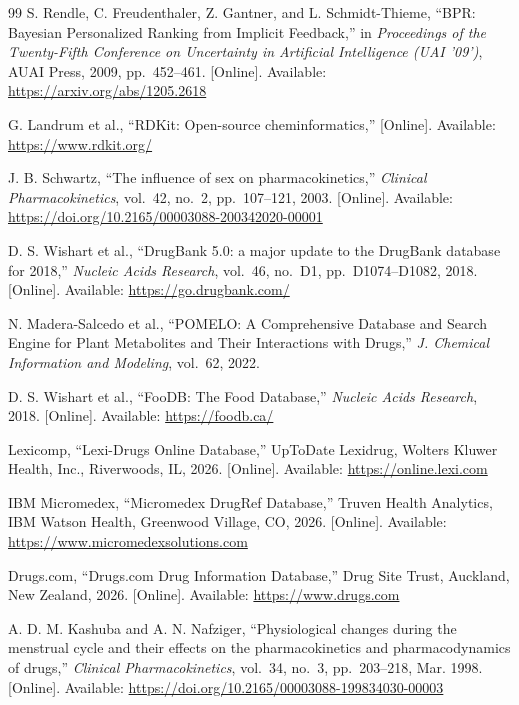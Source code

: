 \begin{thebibliography}{99}
S. Rendle, C. Freudenthaler, Z. Gantner, and L. Schmidt-Thieme,
``BPR: Bayesian Personalized Ranking from Implicit Feedback,''
in \textit{Proceedings of the Twenty-Fifth Conference on Uncertainty in Artificial Intelligence (UAI '09')},
AUAI Press, 2009, pp.~452--461.
[Online]. Available: \url{https://arxiv.org/abs/1205.2618}

G. Landrum et al.,
``RDKit: Open-source cheminformatics,''
[Online]. Available: \url{https://www.rdkit.org/}

J. B. Schwartz,
``The influence of sex on pharmacokinetics,''
\textit{Clinical Pharmacokinetics}, vol.~42, no.~2, pp.~107--121, 2003.
[Online]. Available: \url{https://doi.org/10.2165/00003088-200342020-00001}

D. S. Wishart et al.,
``DrugBank 5.0: a major update to the DrugBank database for 2018,''
\textit{Nucleic Acids Research}, vol.~46, no.~D1, pp.~D1074--D1082, 2018.
[Online]. Available: \url{https://go.drugbank.com/}

N. Madera-Salcedo et al.,
``POMELO: A Comprehensive Database and Search Engine for Plant Metabolites and Their Interactions with Drugs,''
\textit{J. Chemical Information and Modeling}, vol.~62, 2022.

D. S. Wishart et al.,
``FooDB: The Food Database,''
\textit{Nucleic Acids Research}, 2018.
[Online]. Available: \url{https://foodb.ca/}

Lexicomp,
``Lexi-Drugs Online Database,''
UpToDate Lexidrug, Wolters Kluwer Health, Inc., Riverwoods, IL, 2026.
[Online]. Available: \url{https://online.lexi.com}

IBM Micromedex,
``Micromedex DrugRef Database,''
Truven Health Analytics, IBM Watson Health, Greenwood Village, CO, 2026.
[Online]. Available: \url{https://www.micromedexsolutions.com}

Drugs.com,
``Drugs.com Drug Information Database,''
Drug Site Trust, Auckland, New Zealand, 2026.
[Online]. Available: \url{https://www.drugs.com}

A. D. M. Kashuba and A. N. Nafziger,
``Physiological changes during the menstrual cycle and their effects on the pharmacokinetics and pharmacodynamics of drugs,''
\textit{Clinical Pharmacokinetics}, vol.~34, no.~3, pp.~203--218, Mar. 1998.
[Online]. Available: \url{https://doi.org/10.2165/00003088-199834030-00003}


\end{thebibliography}
